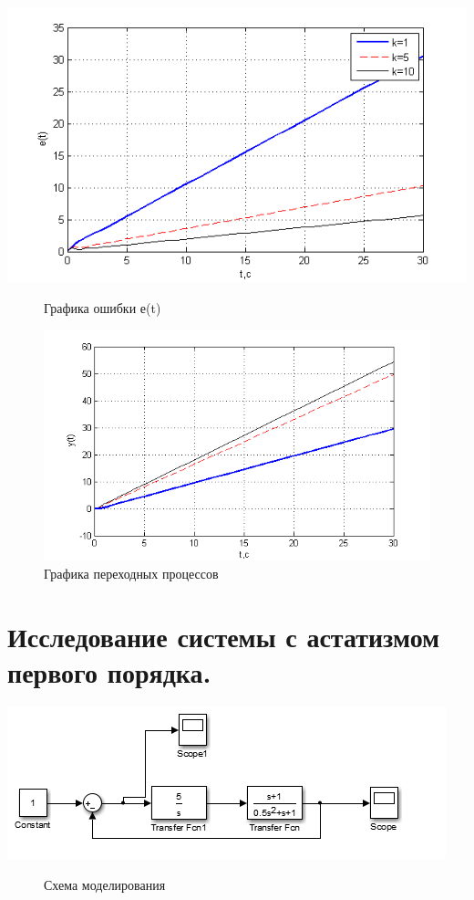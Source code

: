 \documentclass[a4paper, 11pt]{article}
\begin{document}
\begin{center}
	\includegraphics[width=0.7\linewidth]{33}
	\begin{figure}[h]
		\centering
		
		\caption{Графика ошибки е(t)}
		\label{fig:33}
	\end{figure}
\end{center}

\begin{figure}[h]
	\centering
	\includegraphics[width=0.7\linewidth]{44}
	\caption{Графика переходных процессов}
	\label{fig:44}
\end{figure}

\section{Исследование системы с астатизмом первого порядка.}


\begin{center}
	\includegraphics[width=0.6\linewidth]{5}
	\begin{figure}
	
		
		\caption{Схема моделирования}
		\label{fig:5}
	\end{figure}
\end{center}
\end{document}
